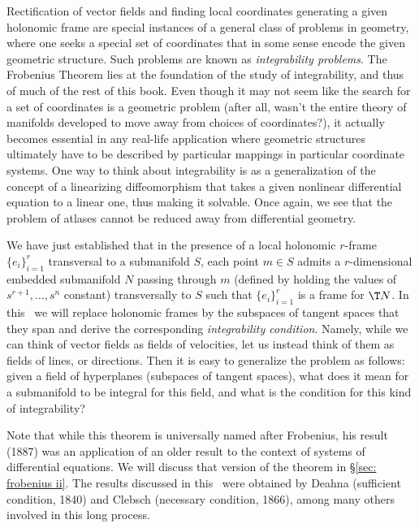 \begin{intu*}
    Rectification of vector fields and finding local coordinates generating a given holonomic frame are special instances of a general class of problems in geometry, where one seeks a special set of coordinates that in some sense encode the given geometric structure. Such problems are known as \emph{integrability problems}. The Frobenius Theorem lies at the foundation of the study of integrability, and thus of much of the rest of this book. Even though it may not seem like the search for a set of coordinates is a geometric problem (after all, wasn't the entire theory of manifolds developed to move away from choices of coordinates?), it actually becomes essential in any real-life application where geometric structures ultimately have to be described by particular mappings in particular coordinate systems. One way to think about integrability is as a generalization of the concept of a linearizing diffeomorphism that takes a given nonlinear differential equation to a linear one, thus making it solvable. Once again, we see that the problem of atlases cannot be reduced away from differential geometry.
\end{intu*}

We have just established that in the presence of a local holonomic $r$-frame $\{e_i\}_{i=1}^r$ transversal to a submanifold $S$, each point $m\in S$ admits a $r$-dimensional embedded submanifold $N$ passing through $m$ (defined by holding the values of $s^{r+1},\ldots,s^n$ constant) transversally to $S$ such that $\{e_i\}_{i=1}^r$ is a frame for $\T N$. In this \sect\ we will replace holonomic frames by the subspaces of tangent spaces that they span and derive the corresponding \emph{integrability condition}. Namely, while we can think of vector fields as fields of velocities, let us instead think of them as fields of lines, or directions. Then it is easy to generalize the problem as follows: given a field of hyperplanes (subspaces of tangent spaces), what does it mean for a submanifold to be integral for this field, and what is the condition for this kind of integrability?

\begin{hrem*}
    Note that while this theorem is universally named after Frobenius, his result (1887) was an application of an older result to the context of systems of differential equations. We will discuss that version of the theorem in \S\ref{sec: frobenius ii}. The results discussed in this \sect\ were obtained by Deahna (sufficient condition, 1840) and Clebsch (necessary condition, 1866), among many others involved in this long process.
\end{hrem*}

